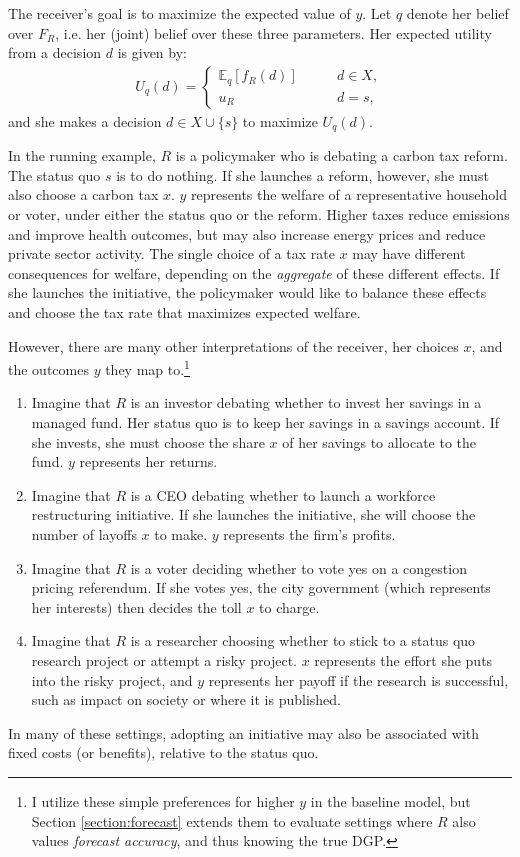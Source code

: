 \documentclass[11pt,dvipsnames]{article}
\begin{document}
The receiver's goal is to maximize the expected value of $y$.
Let $q$ denote her belief over $F_R$, i.e. her (joint) belief over these three parameters.
Her expected utility from a decision $d$ is given by:
\begin{align*}
U_q(d) = \begin{cases}
	\mathbb{E}_{q}[f_R(d)] \qquad & d \in X,
	\\
	u_R \qquad & d = s,
 \end{cases}
\end{align*}
and she makes a decision $d \in X \cup \{s\}$ to maximize $U_q(d)$.

In the running example, $R$ is a policymaker who is debating a carbon tax reform.
The status quo $s$ is to do nothing.
If she launches a reform, however, she must also choose a carbon tax $x$.
$y$ represents the welfare of a representative household or voter, under either the status quo or the reform. 
Higher taxes reduce emissions and improve health outcomes, but may also increase energy prices and reduce private sector activity.
The single choice of a tax rate $x$ may have different consequences for welfare, depending on the \emph{aggregate} of these different effects.
If she launches the initiative, the policymaker would like to balance these effects and choose the tax rate that maximizes expected welfare.

However, there are many other interpretations of the receiver, her choices $x$, and the outcomes $y$ they map to.\footnote{I utilize these simple preferences for higher $y$ in the baseline model, but Section \ref{section:forecast} extends them to evaluate settings where $R$ also values \emph{forecast accuracy}, and thus knowing the true DGP.}
\begin{enumerate}
\item Imagine that $R$ is an investor debating whether to invest her savings in a managed fund. Her status quo is to keep her savings in a savings account. If she invests, she must choose the share $x$ of her savings to allocate to the fund. $y$ represents her returns.
\item Imagine that $R$ is a CEO debating whether to launch a workforce restructuring initiative. If she launches the initiative, she will choose the number of layoffs $x$ to make. $y$ represents the firm's profits.
\item Imagine that $R$ is a voter deciding whether to vote yes on a congestion pricing referendum. If she votes yes, the city government (which represents her interests) then decides the toll $x$ to charge.
\item Imagine that $R$ is a researcher choosing whether to stick to a status quo research project or attempt a risky project. $x$ represents the effort she puts into the risky project, and $y$ represents her payoff if the research is successful, such as impact on society or where it is published.
\end{enumerate}
In many of these settings, adopting an initiative may also be associated with fixed costs (or benefits), relative to the status quo. 
\end{document}
